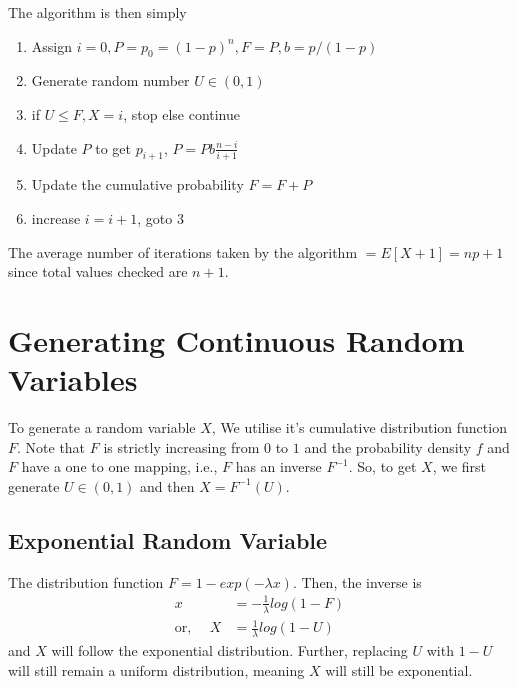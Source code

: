 \documentclass[../probability-notes.tex]{subfiles}
\begin{document}
    The algorithm is then simply
    \begin{enumerate}
        \item Assign $i = 0, P = p_{0} = (1-p)^{n}, F = P, b = p/(1-p)$
        \item Generate random number $U \in (0, 1)$
        \item if $U \leq F, X = i$, stop else continue
        \item Update $P$ to get $p_{i+1}$, $P = Pb\frac{n-i}{i+1}$
        \item Update the cumulative probability $F = F + P$
        \item increase $i = i + 1$, goto 3
    \end{enumerate}

    The average number of iterations taken by the algorithm $= E[X + 1] = np + 1$ since total values checked are $n + 1$.


    \section{Generating Continuous Random Variables}
    To generate a random variable $X$, We utilise it's cumulative distribution function $F$. Note that $F$ is strictly increasing from $0$ to $1$ and the probability density $f$ and $F$ have a one to one mapping, i.e., $F$ has an inverse $F^{-1}$. So, to get $X$, we first generate $U \in (0, 1)$ and then $X = F^{-1}(U)$.\newline

    \subsection{Exponential Random Variable}
    The distribution function $F = 1 - exp(-\lambda x)$. Then, the inverse is
    \begin{align*}
        x &= -\frac{1}{\lambda}log(1 - F)\\
        \text{or, }\quad X &= \frac{1}{\lambda}log(1 - U)
    \end{align*}
    and $X$ will follow the exponential distribution. Further, replacing $U$ with $1-U$ will still remain a uniform distribution, meaning $X$ will still be exponential.

    
\end{document}
